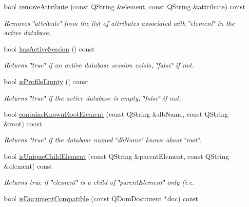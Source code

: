 \begin{DoxyCompactItemize}
bool \hyperlink{class_g_c_data_base_interface_a6fbf551a825c0fca13926449be4a5215}{remove\-Attribute} (const \-Q\-String \&element, const \-Q\-String \&attribute) const 
\begin{DoxyCompactList}\small\item\em \-Removes \char`\"{}attribute\char`\"{} from the list of attributes associated with \char`\"{}element\char`\"{} in the active database. \end{DoxyCompactList}\item 
bool \hyperlink{class_g_c_data_base_interface_a875e3999c9d91b5e0f59be8bdef54408}{has\-Active\-Session} () const 
\begin{DoxyCompactList}\small\item\em \-Returns \char`\"{}true\char`\"{} if an active database session exists, \char`\"{}false\char`\"{} if not. \end{DoxyCompactList}\item 
bool \hyperlink{class_g_c_data_base_interface_ae570c403f1b6b7f85e6a5c46829f42a8}{is\-Profile\-Empty} () const 
\begin{DoxyCompactList}\small\item\em \-Returns \char`\"{}true\char`\"{} if the active database is empty, \char`\"{}false\char`\"{} if not. \end{DoxyCompactList}\item 
bool \hyperlink{class_g_c_data_base_interface_a91183c2d227bf90d0d26fccc1e4ae878}{contains\-Known\-Root\-Element} (const \-Q\-String \&db\-Name, const \-Q\-String \&root) const 
\begin{DoxyCompactList}\small\item\em \-Returns \char`\"{}true\char`\"{} if the database named \char`\"{}db\-Name\char`\"{} knows about \char`\"{}root\char`\"{}. \end{DoxyCompactList}\item 
bool \hyperlink{class_g_c_data_base_interface_a94559ea23489e360757db42c50d3a261}{is\-Unique\-Child\-Element} (const \-Q\-String \&parent\-Element, const \-Q\-String \&element) const 
\begin{DoxyCompactList}\small\item\em \-Returns true if \char`\"{}element\char`\"{} is a child of \char`\"{}parent\-Element\char`\"{} only (i.\-e. \end{DoxyCompactList}\item 
bool \hyperlink{class_g_c_data_base_interface_ae16d516cbefe58ccf9ef0e8ece4a394f}{is\-Document\-Compatible} (const \-Q\-Dom\-Document $\ast$doc) const 

\end{DoxyCompactItemize}
